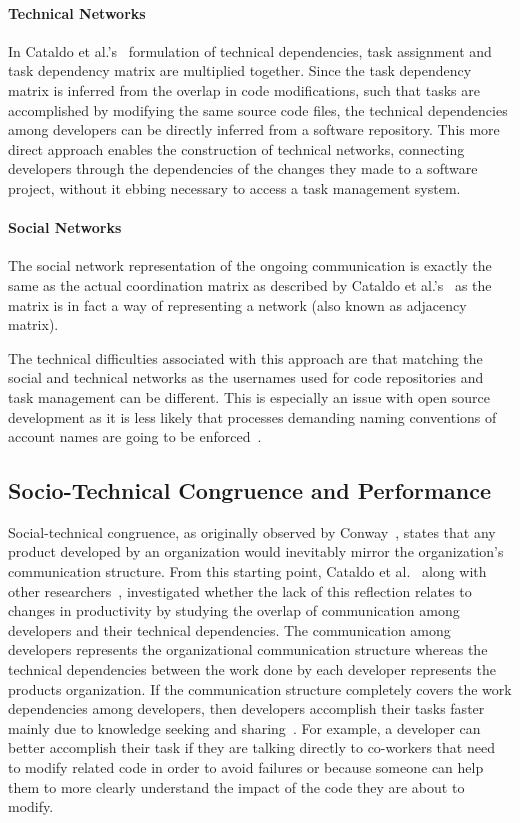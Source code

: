 \paragraph{Technical Networks}
In Cataldo et al.'s~\cite{cataldo:cscw:2006} formulation of technical dependencies, task assignment and task dependency matrix are multiplied together.
Since the task dependency matrix is inferred from the overlap in code modifications, such that tasks are accomplished by modifying the same source code files, the technical dependencies among developers can be directly inferred from a software repository.
This more direct approach enables the construction of technical networks, connecting developers through the dependencies of the changes they made to a software project, without it ebbing necessary to access a task management system.

\paragraph{Social Networks}
The social network representation of the ongoing communication is exactly the same as the actual coordination matrix as described by Cataldo et al.'s~\cite{cataldo:cscw:2006} as the matrix is in fact a way of representing a network (also known as adjacency matrix).

The technical difficulties associated with this approach are that matching the social and technical networks as the usernames used for code repositories and task management can be different. 
This is especially an issue with open source development as it is less likely that processes demanding naming conventions of account names are going to be enforced~\cite{schroeter:isese:2006}.

\subsection{Socio-Technical Congruence and Performance}
Social-technical congruence, as originally observed by Conway~\cite{conway:datamination:1968}, states that any product developed by an organization would inevitably mirror the organization's communication structure.
From this starting point, Cataldo et al.~\cite{cataldo:cscw:2006} along with other researchers~\cite{valetto:msr:2007,ducheneaut:cscw:2005,ehrlich:stc:2008}, investigated whether the lack of this reflection relates to changes in productivity by studying the overlap of communication among developers and their technical dependencies.
The communication among developers represents the organizational communication structure whereas the technical dependencies between the work done by each developer represents the products organization.
If the communication structure completely covers the work dependencies among developers, then developers accomplish their tasks faster mainly due to knowledge seeking and sharing~\cite{desouza2006:knowledge}.
For example, a developer can better accomplish their task if they are talking directly to co-workers that need to modify related code in order to avoid failures or because someone can help them to more clearly understand the impact of the code they are about to modify.

